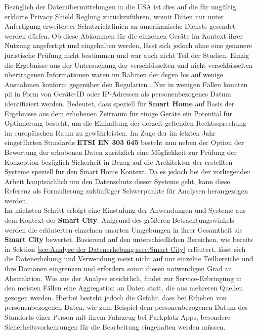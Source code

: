 Bezüglich der Datenübermittelungen in die USA ist dies auf die für ungültig erklärte Privacy Shield Reglung \cite{Dsgvo2016} zurückzuführen, womit Daten nur unter Anfertigung erweiterter Schutzrichtlinien an amerikanische Dienste gesendet werden dürfen. Ob diese Abkommen für die einzelnen Geräte im Kontext ihrer Nutzung angefertigt und eingehalten werden, lässt sich jedoch ohne eine genauere juristische Prüfung nicht bestimmen und war auch nicht Teil der Studien. 
Einzig die Ergebnisse aus der Untersuchung der verschlüsselten und nicht verschlüsselten übertragenen Informationen waren im Rahmen der \ac{dsgvo} bis auf wenige Ausnahmen konform gegenüber den Regularien \cite{Ren2019}. Nur in wenigen Fällen konnten \ac{pii} in Form von Geräte-ID oder IP-Adressen als personenbezogenes Datum identifiziert werden.
Bedeutet, dass speziell für \textbf{Smart Home} auf Basis der Ergebnisse aus dem erhobenen Zeitraum für einige Geräte ein Potential für Optimierung besteht, um die Einhaltung der derzeit geltenden Rechtssprechung im europäischen Raum zu gewährleisten.
Im Zuge der im letzten Jahr eingeführten Standards \textbf{ETSI EN 303 645} \cite{ETSI2020} besteht nun neben der Option der Bewertung der erhobenen Daten zusätzlich eine Möglichkeit zur Prüfung der Konzeption bezüglich Sicherheit in Bezug auf die Architektur der erstellten Systeme speziell für den Smart Home Kontext. Da es jedoch bei der vorliegenden Arbeit hauptsächlich um den Datenschutz dieser Systeme geht, kann diese Referenz als Formulierung zukünftiger Schwerpunkte für Analysen herangezogen werden.\\
Im nächsten Schritt erfolgt eine Einstufung der Anwendungen und Systeme aus dem Kontext der \textbf{Smart City}. Aufgrund des größeren Betrachtungswinkels werden die erläuterten einzelnen smarten Umgebungen in ihrer Gesamtheit als \textbf{Smart City} bewertet. Basierend auf den unterschiedlichen Bereichen, wie bereits in Sektion \ref{sec:Analyse der Datenerhebung:ssec:Smart City} erläutert, lässt sich die Datenerhebung und Verwendung meist nicht auf nur einzelne Teilbereiche und ihre Domänen eingrenzen und erfordern somit diesen notwendigen Grad an Abstraktion.
Wie aus der Analyse \cite{BCG2020} ersichtlich, findet zur Service-Erbringung in den meisten Fällen eine Aggregation an Daten statt, die aus mehreren Quellen gezogen werden. Hierbei besteht jedoch die Gefahr, dass bei Erheben von personenbezogenen Daten, wie zum Beispiel dem personenbezogenen Datum des Standorts einer Person mit ihrem Fahrzeug bei Parkplatz-Apps, besondere Sicherheitsvorkehrungen für die Bearbeitung eingehalten werden müssen.
